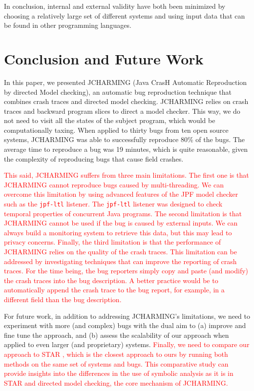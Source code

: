 \documentclass[times, doublespace]{smrauth}
\newcommand{\red}[1]{\textcolor{red}{#1}}
\begin{document}
In conclusion, internal and external validity have both been
minimized by choosing a relatively large set of different
systems and using input data that can be found in other
programming languages.

\section{Conclusion and Future Work\label{sec:conclusion}}

In this paper, we presented JCHARMING (Java CrasH Automatic
Reproduction by directed Model checking), an automatic bug
reproduction technique that combines crash traces and
directed model checking. JCHARMING relies on crash traces and backward program slices to direct a model checker. This way, we do not need to visit all the states of the subject program, which would be computationally taxing.  When applied to thirty bugs from ten open source systems, JCHARMING was able to successfully reproduce 80\% of the bugs. The average time to reproduce a bug was 19 minutes, which is quite reasonable, given the complexity of reproducing bugs that cause field crashes.

\red {This said, JCHARMING suffers from three main limitations. The first one is that JCHARMING cannot reproduce bugs caused by multi-threading. We can overcome this limitation by using advanced features of the JPF model checker such as the \texttt{jpf-ltl} listener. The \texttt{jpf-ltl} listener was designed to check temporal properties of concurrent Java programs. The second limitation is that JCHARMING cannot be used if the bug is caused by external inputs. We can always build a monitoring system to retrieve this data, but this may lead to privacy concerns. Finally, the third limitation is that the performance of JCHARMING relies on the quality of the crash traces. This limitation can be addressed by investigating techniques that can improve the reporting of crash traces. For the time being, the bug reporters simply copy and paste (and modify) the crash traces into the bug description. A better practice would be to automatically append the crash trace to the bug report, for example, in a different field than the bug description.}

For future work, in addition to addressing JCHARMING's limitations, we need to experiment with
more (and complex) bugs with the dual aim to (a) improve and
fine tune the approach, and (b) assess the scalability of our
approach when applied to even larger (and proprietary)
systems.  \red{Finally, we need to compare our approach to STAR \cite{Chen2013a}, which is the closest approach to ours by running both methods on the same set of systems and bugs. This comparative study can provide insights into the differences in the use of symbolic analysis as it is in STAR and directed model checking, the core mechanism of JCHARMING.}

\newpage



\end{document}
